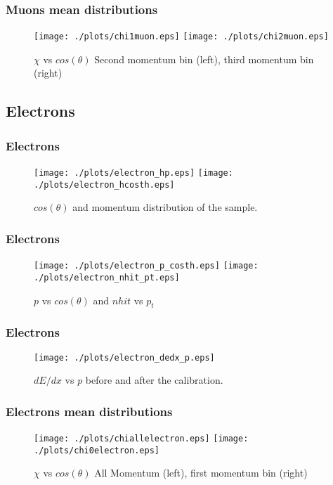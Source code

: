 \documentclass{beamer}
\begin{document}
\begin{frame}\frametitle{Muons mean distributions}
\begin{figure}[!htp]
\centering
\texttt{[image: ./plots/chi1muon.eps]}
\texttt{[image: ./plots/chi2muon.eps]}
\caption{$\chi$ vs $cos(\theta)$ Second momentum bin (left), third momentum bin (right)}
\end{figure}
\end{frame}


\subsection{Electrons}
\begin{frame}\frametitle{Electrons}
\begin{figure}
\texttt{[image: ./plots/electron\_hp.eps]} 
\texttt{[image: ./plots/electron\_hcosth.eps]} 
\caption{$cos(\theta)$ and momentum distribution of the sample.}
\end{figure}
\end{frame}

\begin{frame}\frametitle{Electrons}
\begin{figure}
\texttt{[image: ./plots/electron\_p\_costh.eps]} 
\texttt{[image: ./plots/electron\_nhit\_pt.eps]} 
\caption{$p$ vs $cos(\theta)$ and $nhit$ vs $p_{t}$}
\end{figure}
\end{frame}

\begin{frame}\frametitle{Electrons}
\begin{figure}
\texttt{[image: ./plots/electron\_dedx\_p.eps]} 
\caption{$dE/dx$ vs $p$ before and after the calibration.}
\end{figure}
\end{frame}

\begin{frame}\frametitle{Electrons mean distributions}
\begin{figure}[!htp]
\centering
\texttt{[image: ./plots/chiallelectron.eps]}
\texttt{[image: ./plots/chi0electron.eps]}
\caption{$\chi$ vs $cos(\theta)$ All Momentum (left), first momentum bin (right)}
\end{figure}
\end{frame}
\end{document}
